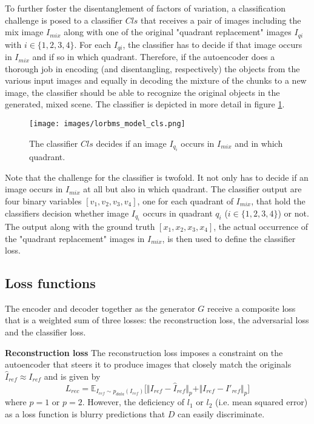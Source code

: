 \documentclass[12pt,a4paper]{article}
\begin{document}
To further foster the disentanglement of factors of variation, a classification challenge is posed to a classifier $Cls$ that receives a pair of images including the mix image $I_{mix}$ along with one of the original "quadrant replacement" images $I_{qi}$ with $i \in \{1,2,3,4\}$. For each $I_{qi}$, the classifier has to decide if that image occurs in $I_{mix}$ and if so in which quadrant. Therefore, if the autoencoder does a thorough job in encoding (and disentangling, respectively) the objects from the various input images and equally in decoding the mixture of the chunks to a new image, the classifier should be able to recognize the original objects in the generated, mixed scene. The classifier is depicted in more detail in figure \ref{fig:model_cls}.
\begin{figure}[ht]
\centering
\texttt{[image: images/lorbms\_model\_cls.png]}
\caption{The classifier $Cls$ decides if an image $I_{q_i}$ occurs in $I_{mix}$ and in which quadrant.}
\label{fig:model_cls}
\end{figure}
Note that the challenge for the classifier is twofold. It not only has to decide if an image occurs in $I_{mix}$ at all but also in which quadrant. The classifier output are four binary variables $[v_1,v_2,v_3,v_4]$, one for each quadrant of $I_{mix}$, that hold the classifiers decision whether image $I_{q_i}$ occurs in quadrant $q_i$ ($i \in \{1,2,3,4\}$) or not. The output along with the ground truth $[x_1,x_2,x_3,x_4]$, the actual occurrence of the "quadrant replacement" images in $I_{mix}$, is then used to define the classifier loss.


\subsection{Loss functions}
The encoder and decoder together as the generator $G$ receive a composite loss that is a weighted sum of three losses: the reconstruction loss, the adversarial loss and the classifier loss. 

\textbf{Reconstruction loss} The reconstruction loss imposes a constraint on the autoencoder that steers it to produce images that closely match the originals $\hat{I}_{ref} \approx I_{ref}$ and is given by
\begin{equation} \label{eq:4}
    L_{rec} = \mathbb{E}_{I_{ref}\sim p_{data} (I_{ref})}\big[ \Vert I_{ref} - \hat{I}_{ref} \Vert_p + \Vert I_{ref} - I'_{ref} \Vert_p \big]
\end{equation}
where $p = 1$ or $p = 2$. However, the deficiency of $l_1$ or $l_2$ (i.e. mean squared error) as a loss function is blurry predictions that $D$ can easily discriminate. 
\end{document}
